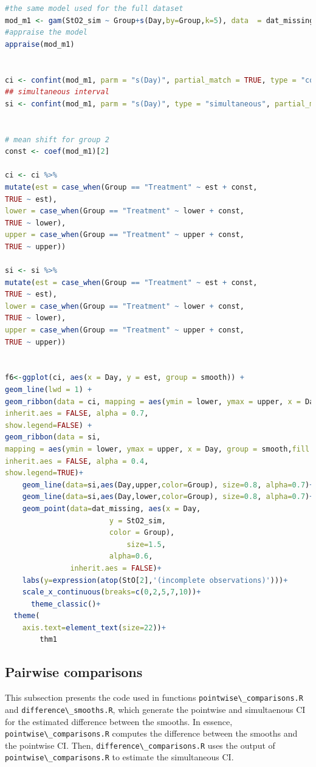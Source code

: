 \documentclass[
]{article}
\newcommand{\passthrough}[1]{#1}
\begin{document}
\begin{lstlisting}[language=R]
#the same model used for the full dataset
mod_m1 <- gam(StO2_sim ~ Group+s(Day,by=Group,k=5), data  = dat_missing)
#appraise the model
appraise(mod_m1)


ci <- confint(mod_m1, parm = "s(Day)", partial_match = TRUE, type = "confidence")
## simultaneous interval
si <- confint(mod_m1, parm = "s(Day)", type = "simultaneous", partial_match = TRUE)


# mean shift for group 2
const <- coef(mod_m1)[2]

ci <- ci %>%
mutate(est = case_when(Group == "Treatment" ~ est + const,
TRUE ~ est),
lower = case_when(Group == "Treatment" ~ lower + const,
TRUE ~ lower),
upper = case_when(Group == "Treatment" ~ upper + const,
TRUE ~ upper))

si <- si %>%
mutate(est = case_when(Group == "Treatment" ~ est + const,
TRUE ~ est),
lower = case_when(Group == "Treatment" ~ lower + const,
TRUE ~ lower),
upper = case_when(Group == "Treatment" ~ upper + const,
TRUE ~ upper))


f6<-ggplot(ci, aes(x = Day, y = est, group = smooth)) +
geom_line(lwd = 1) +
geom_ribbon(data = ci, mapping = aes(ymin = lower, ymax = upper, x = Day, group = smooth,fill = Group),
inherit.aes = FALSE, alpha = 0.7,
show.legend=FALSE) +
geom_ribbon(data = si,
mapping = aes(ymin = lower, ymax = upper, x = Day, group = smooth,fill =Group),
inherit.aes = FALSE, alpha = 0.4,
show.legend=TRUE)+
    geom_line(data=si,aes(Day,upper,color=Group), size=0.8, alpha=0.7)+
    geom_line(data=si,aes(Day,lower,color=Group), size=0.8, alpha=0.7)+
    geom_point(data=dat_missing, aes(x = Day, 
                        y = StO2_sim, 
                        color = Group), 
                            size=1.5,
                        alpha=0.6, 
               inherit.aes = FALSE)+
    labs(y=expression(atop(StO[2],'(incomplete observations)')))+
    scale_x_continuous(breaks=c(0,2,5,7,10))+
      theme_classic()+
  theme(
    axis.text=element_text(size=22))+
        thm1
\end{lstlisting}

\hypertarget{pairwise-comparisons}{%
\subsection{Pairwise comparisons}\label{pairwise-comparisons}}

This subsection presents the code used in functions \passthrough{\lstinline!pointwise\_comparisons.R!} and \passthrough{\lstinline!difference\_smooths.R!}, which generate the pointwise and simultaenous CI for the estimated difference between the smooths. In essence, \passthrough{\lstinline!pointwise\_comparisons.R!} computes the difference between the smooths and the pointwise CI. Then, \passthrough{\lstinline!difference\_comparisons.R!} uses the output of \passthrough{\lstinline!pointwise\_comparisons.R!} to estimate the simultaneous CI.
\end{document}
